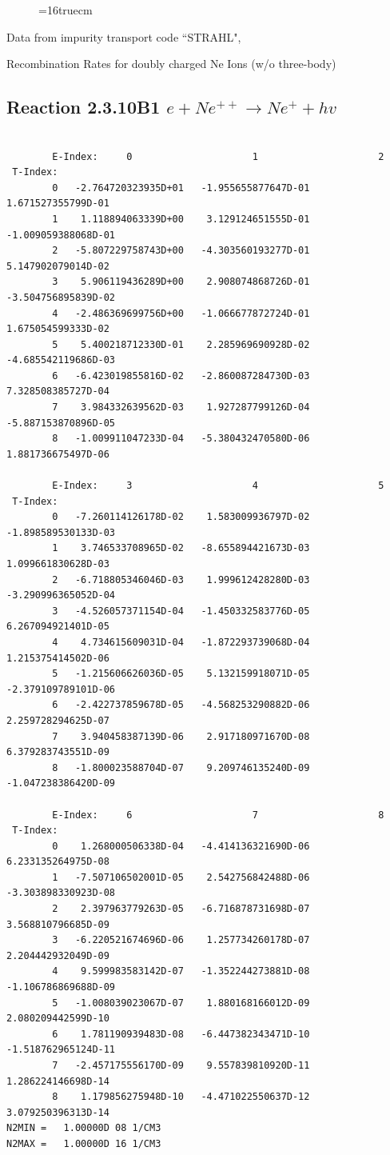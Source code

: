 \documentclass[12pt,dvipdfmx]{article}
\begin{document}
\begin{figure} \label{2.3.10B0}
\epsfxsize=16truecm
\end{figure}
\newpage
Data from impurity transport code ``STRAHL", \cite{kn:Behringer}

  Recombination Rates for doubly charged Ne Ions (w/o three-body)
\subsection{
Reaction 2.3.10B1   $e + Ne^{++}\rightarrow  Ne^+ + hv$
}



\begin{small}\begin{verbatim}

        E-Index:     0                     1                     2
 T-Index:
        0   -2.764720323935D+01   -1.955655877647D-01    1.671527355799D-01
        1    1.118894063339D+00    3.129124651555D-01   -1.009059388068D-01
        2   -5.807229758743D+00   -4.303560193277D-01    5.147902079014D-02
        3    5.906119436289D+00    2.908074868726D-01   -3.504756895839D-02
        4   -2.486369699756D+00   -1.066677872724D-01    1.675054599333D-02
        5    5.400218712330D-01    2.285969690928D-02   -4.685542119686D-03
        6   -6.423019855816D-02   -2.860087284730D-03    7.328508385727D-04
        7    3.984332639562D-03    1.927287799126D-04   -5.887153870896D-05
        8   -1.009911047233D-04   -5.380432470580D-06    1.881736675497D-06

        E-Index:     3                     4                     5
 T-Index:
        0   -7.260114126178D-02    1.583009936797D-02   -1.898589530133D-03
        1    3.746533708965D-02   -8.655894421673D-03    1.099661830628D-03
        2   -6.718805346046D-03    1.999612428280D-03   -3.290996365052D-04
        3   -4.526057371154D-04   -1.450332583776D-05    6.267094921401D-05
        4    4.734615609031D-04   -1.872293739068D-04    1.215375414502D-06
        5   -1.215606626036D-05    5.132159918071D-05   -2.379109789101D-06
        6   -2.422737859678D-05   -4.568253290882D-06    2.259728294625D-07
        7    3.940458387139D-06    2.917180971670D-08    6.379283743551D-09
        8   -1.800023588704D-07    9.209746135240D-09   -1.047238386420D-09

        E-Index:     6                     7                     8
 T-Index:
        0    1.268000506338D-04   -4.414136321690D-06    6.233135264975D-08
        1   -7.507106502001D-05    2.542756842488D-06   -3.303898330923D-08
        2    2.397963779263D-05   -6.716878731698D-07    3.568810796685D-09
        3   -6.220521674696D-06    1.257734260178D-07    2.204442932049D-09
        4    9.599983583142D-07   -1.352244273881D-08   -1.106786869688D-09
        5   -1.008039023067D-07    1.880168166012D-09    2.080209442599D-10
        6    1.781190939483D-08   -6.447382343471D-10   -1.518762965124D-11
        7   -2.457175556170D-09    9.557839810920D-11    1.286224146698D-14
        8    1.179856275948D-10   -4.471022550637D-12    3.079250396313D-14
N2MIN =   1.00000D 08 1/CM3
N2MAX =   1.00000D 16 1/CM3


\end{verbatim}
\end{small}
\end{document}
